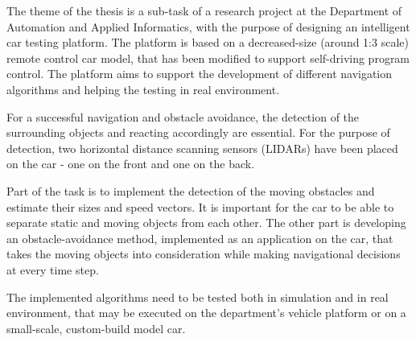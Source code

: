 The theme of the thesis is a sub-task of a research project at the Department of Automation and Applied Informatics, with the purpose of designing an intelligent car testing platform. The platform is based on a decreased-size (around 1:3 scale) remote control car model, that has been modified to support self-driving program control. The platform aims to support the development of different navigation algorithms and helping the testing in real environment.

For a successful navigation and obstacle avoidance, the detection of the surrounding objects and reacting accordingly are essential. For the purpose of detection, two horizontal distance scanning sensors (LIDARs) have been placed on the car - one on the front and one on the back.

Part of the task is to implement the detection of the moving obstacles and estimate their sizes and speed vectors. It is important for the car to be able to separate static and moving objects from each other. The other part is developing an obstacle-avoidance method, implemented as an application on the car, that takes the moving objects into consideration while making navigational decisions at every time step.

The implemented algorithms need to be tested both in simulation and in real environment, that may be executed on  the department's vehicle platform or on a small-scale, custom-build model car.

\vfill
\selectthesislanguage

\setcounter{romanPage}{\value{page}}
\textbf{}